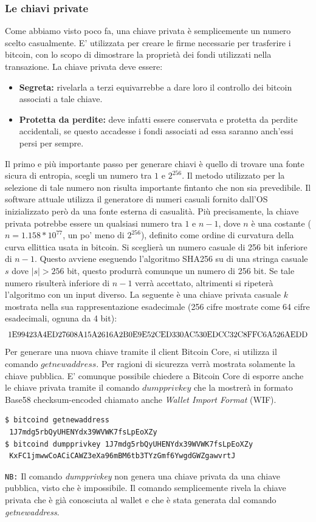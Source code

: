 \subsubsection{Le chiavi private}
Come abbiamo visto poco fa, una chiave privata è semplicemente un numero scelto casualmente. E' utilizzata per creare le firme necessarie per trasferire i bitcoin, con lo scopo di dimostrare la proprietà dei fondi utilizzati nella transazione. La chiave privata deve essere:
\begin{itemize}
	\item \textbf{Segreta:} rivelarla a terzi equivarrebbe a dare loro il controllo dei bitcoin associati a tale chiave.
	\item \textbf{Protetta da perdite:} deve infatti essere conservata e protetta da perdite accidentali, se questo accadesse i fondi associati ad essa saranno anch'essi persi per sempre.
\end{itemize}
Il primo e più importante passo per generare chiavi è quello di trovare una fonte sicura di entropia, scegli un numero tra $1$ e $2^{256}$. Il metodo utilizzato per la selezione di tale numero non risulta importante fintanto che non sia prevedibile. Il software attuale utilizza il generatore di numeri casuali fornito dall'OS inizializzato però da una fonte esterna di casualità. Più precisamente, la chiave privata potrebbe essere un qualsiasi numero tra $1$ e $n-1$, dove $n$ è una costante ($n=1.158*10^{77}$, un po' meno di $2^{256}$), definito come ordine di curvatura della curva ellittica usata in bitcoin. Si sceglierà un numero casuale di 256 bit inferiore di $n-1$. Questo avviene eseguendo l'algoritmo SHA256 su di una stringa casuale $s$ dove $|s|>256$ bit, questo produrrà comunque un numero di 256 bit. Se tale numero risulterà inferiore di $n-1$ verrà accettato, altrimenti si ripeterà l'algoritmo con un input diverso. La seguente è una chiave privata casuale $k$ mostrata nella sua rappresentazione esadecimale (256 cifre mostrate come 64 cifre esadecimali, ognuna da 4 bit):
\[\text{\small 1E99423A4ED27608A15A2616A2B0E9E52CED330AC530EDCC32C8FFC6A526AEDD}\]
Per generare una nuova chiave tramite il client Bitcoin Core, si utilizza il comando $getnewaddress$. Per ragioni di sicurezza verrà mostrata solamente la chiave pubblica. E' comunque possibile chiedere a Bitcoin Core  di esporre anche le chiave privata tramite il comando $dumpprivkey$ che la mostrerà in formato Base58 checksum-encoded chiamato anche \textit{Wallet Import Format} (WIF).
\begin{lstlisting}
$ bitcoind getnewaddress
 1J7mdg5rbQyUHENYdx39WVWK7fsLpEoXZy
$ bitcoind dumpprivkey 1J7mdg5rbQyUHENYdx39WVWK7fsLpEoXZy
 KxFC1jmwwCoACiCAWZ3eXa96mBM6tb3TYzGmf6YwgdGWZgawvrtJ
\end{lstlisting}
\texttt{NB:} Il comando \textit{dumpprivkey} non genera una chiave privata da una chiave pubblica, visto che è impossibile. Il comando semplicemente rivela la chiave privata che è già conosciuta al wallet e che è stata generata dal comando \textit{getnewaddress}.

